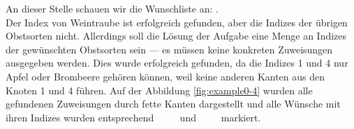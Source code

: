 An dieser Stelle schauen wir die Wunschliste an: .\\
Der Index von Weintraube ist erfolgreich gefunden, aber die Indizes der übrigen Obstsorten nicht.
Allerdings soll die Lösung der Aufgabe eine Menge an Indizes der gewünschten Obstsorten sein ---
es müssen keine konkreten Zuweisungen ausgegeben werden. 
Dies wurde erfolgreich gefunden, da die Indizes 1 und 4 nur Apfel oder Brombeere gehören können, weil
keine anderen Kanten aus den Knoten 1 und 4 führen.
Auf der Abbildung \ref{fig:example0-4} wurden alle gefundenen Zuweisungen durch fette Kanten dargestellt
und alle Wünsche mit ihren Indizes wurden entsprechend \colorbox{black!30!green}{\textcolor{white}{grün}} und \colorbox{black!5!blue}{\textcolor{white}{blau}} markiert.



